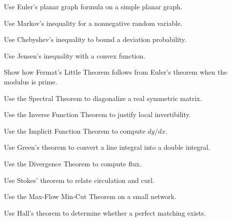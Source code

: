 \begin{exercise}[2]
Use Euler's planar graph formula on a simple planar graph.
\end{exercise}

\begin{exercise}[2]
Use Markov's inequality for a nonnegative random variable.
\end{exercise}

\begin{exercise}[2]
Use Chebyshev's inequality to bound a deviation probability.
\end{exercise}

\begin{exercise}[2]
Use Jensen's inequality with a convex function.
\end{exercise}

\begin{exercise}[3]
Show how Fermat's Little Theorem follows from Euler's theorem when the
modulus is prime.
\end{exercise}

\begin{exercise}[3]
Use the Spectral Theorem to diagonalize a real symmetric matrix.
\end{exercise}

\begin{exercise}[3]
Use the Inverse Function Theorem to justify local invertibility.
\end{exercise}

\begin{exercise}[3]
Use the Implicit Function Theorem to compute \(dy/dx\).
\end{exercise}

\begin{exercise}[3]
Use Green's theorem to convert a line integral into a double integral.
\end{exercise}

\begin{exercise}[3]
Use the Divergence Theorem to compute flux.
\end{exercise}

\begin{exercise}[3]
Use Stokes' theorem to relate circulation and curl.
\end{exercise}

\begin{exercise}[3]
Use the Max-Flow Min-Cut Theorem on a small network.
\end{exercise}

\begin{exercise}[3]
Use Hall's theorem to determine whether a perfect matching exists.
\end{exercise}

